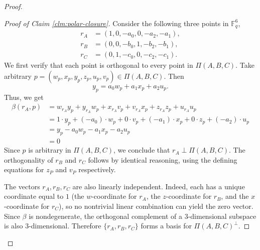 \documentclass[11pt,a4paper]{article}
\theoremstyle{definition}
\theoremstyle{remark}
\begin{document}
\begin{proof}
\begin{proof}[Proof of Claim \ref{clm:polar-closure}]
Consider the following three points in $\mathbb{F}_q^6$, 
\[
\begin{aligned}
r_A &= (1, 0, -a_0, 0, -a_2, -a_1), \\
r_B &= (0, 0, -b_0, 1, -b_2, -b_1), \\
r_C &= (0, 1, -c_0, 0, -c_2, -c_1).
\end{aligned}
\]
We first verify that each point is orthogonal to every point in $\Pi(A,B,C)$. Take arbitrary $p = (w_p,x_p,y_p,z_p,u_p,v_p) \in \Pi(A,B,C)$. Then
\[
y_p = a_0 w_p + a_1 x_p + a_2 u_p.
\]
Thus, we get
\begin{align*}
\beta(r_A,p)
&= w_{r_A}y_p + y_{r_A}w_p + x_{r_A}v_p + v_{r_A}x_p + z_{r_A}z_p + u_{r_A}u_p \\
&= 1\cdot y_p + (-a_0)\cdot w_p + 0\cdot v_p + (-a_1)\cdot x_p + 0\cdot z_p + (-a_2)\cdot u_p \\
&= y_p - a_0 w_p - a_1 x_p - a_2 u_p\\
&=0
\end{align*}
Since $p$ is arbitrary in $\Pi(A,B,C)$, we conclude that $r_A \perp \Pi(A,B,C)$. 
The orthogonality of $r_B$ and $r_C$ follows by identical reasoning, using the defining equations for $z_P$ and $v_P$ respectively.

The vectors $r_A, r_B, r_C$ are also linearly independent. Indeed, each has a unique coordinate equal to $1$ (the $w$-coordinate for $r_A$, the $z$-coordinate for $r_B$, and the $x$-coordinate for $r_C$), so no nontrivial linear combination can yield the zero vector. Since $\beta$ is nondegenerate, the orthogonal complement of a $3$-dimensional subspace is also $3$-dimensional. Therefore $\{r_A, r_B, r_C\}$ forms a basis for $\Pi(A,B,C)^\perp$.


\end{proof}
\end{proof}
\end{document}
